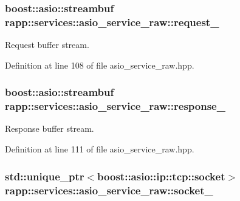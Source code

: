 \hypertarget{classrapp_1_1services_1_1asio__service__raw_a6d53e73589def6049fda150fab228df8}{
\subsubsection[{request\-\_\-}]{\setlength{\rightskip}{0pt plus 5cm}boost\-::asio\-::streambuf rapp\-::services\-::asio\-\_\-service\-\_\-raw\-::request\-\_\-\hspace{0.3cm}{\ttfamily [protected]}}}\label{classrapp_1_1services_1_1asio__service__raw_a6d53e73589def6049fda150fab228df8}


Request buffer stream. 



Definition at line 108 of file asio\-\_\-service\-\_\-raw.\-hpp.

\hypertarget{classrapp_1_1services_1_1asio__service__raw_a94d17ec39af125c8cfaef0db42ae1aac}{
\subsubsection[{response\-\_\-}]{\setlength{\rightskip}{0pt plus 5cm}boost\-::asio\-::streambuf rapp\-::services\-::asio\-\_\-service\-\_\-raw\-::response\-\_\-\hspace{0.3cm}{\ttfamily [protected]}}}\label{classrapp_1_1services_1_1asio__service__raw_a94d17ec39af125c8cfaef0db42ae1aac}


Response buffer stream. 



Definition at line 111 of file asio\-\_\-service\-\_\-raw.\-hpp.

\hypertarget{classrapp_1_1services_1_1asio__service__raw_a070f217b7642bd28f122bd3fb29e9540}{
\subsubsection[{socket\-\_\-}]{\setlength{\rightskip}{0pt plus 5cm}std\-::unique\-\_\-ptr$<$boost\-::asio\-::ip\-::tcp\-::socket$>$ rapp\-::services\-::asio\-\_\-service\-\_\-raw\-::socket\-\_\-\hspace{0.3cm}{\ttfamily [protected]}}}\label{classrapp_1_1services_1_1asio__service__raw_a070f217b7642bd28f122bd3fb29e9540}


